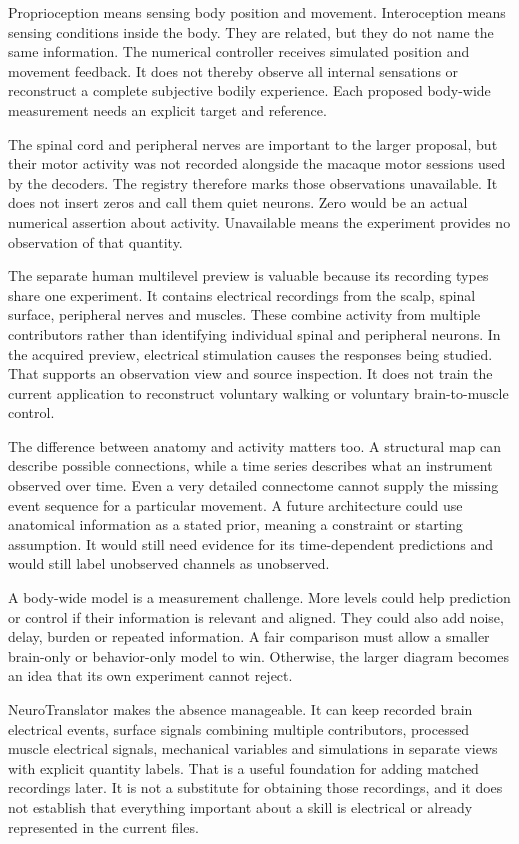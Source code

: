 Proprioception means sensing body position and movement. Interoception means sensing conditions inside the body. They are related, but they do not name the same information. The numerical controller receives simulated position and movement feedback. It does not thereby observe all internal sensations or reconstruct a complete subjective bodily experience. Each proposed body-wide measurement needs an explicit target and reference.

The spinal cord and peripheral nerves are important to the larger proposal, but their motor activity was not recorded alongside the macaque motor sessions used by the decoders. The registry therefore marks those observations unavailable. It does not insert zeros and call them quiet neurons. Zero would be an actual numerical assertion about activity. Unavailable means the experiment provides no observation of that quantity.

The separate human multilevel preview is valuable because its recording types share one experiment. It contains electrical recordings from the scalp, spinal surface, peripheral nerves and muscles. These combine activity from multiple contributors rather than identifying individual spinal and peripheral neurons. In the acquired preview, electrical stimulation causes the responses being studied. That supports an observation view and source inspection. It does not train the current application to reconstruct voluntary walking or voluntary brain-to-muscle control.\cite{spinal_dataset2023,spinal_companion2023}

The difference between anatomy and activity matters too. A structural map can describe possible connections, while a time series describes what an instrument observed over time. Even a very detailed connectome cannot supply the missing event sequence for a particular movement. A future architecture could use anatomical information as a stated prior, meaning a constraint or starting assumption. It would still need evidence for its time-dependent predictions and would still label unobserved channels as unobserved.

A body-wide model is a measurement challenge. More levels could help prediction or control if their information is relevant and aligned. They could also add noise, delay, burden or repeated information. A fair comparison must allow a smaller brain-only or behavior-only model to win. Otherwise, the larger diagram becomes an idea that its own experiment cannot reject.

NeuroTranslator makes the absence manageable. It can keep recorded brain electrical events, surface signals combining multiple contributors, processed muscle electrical signals, mechanical variables and simulations in separate views with explicit quantity labels. That is a useful foundation for adding matched recordings later. It is not a substitute for obtaining those recordings, and it does not establish that everything important about a skill is electrical or already represented in the current files.

